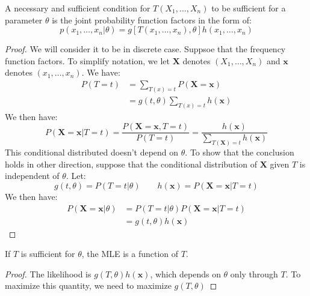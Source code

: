 \begin{theorem}
    A necessary and sufficient condition for $T(X_1,\dots,X_n)$ to be sufficient for a parameter $\theta$ is the joint probability function factors in the form of:
    \begin{equation*}
        p(x_1,\dots,x_n|\theta) = g[T(x_1,\dots,x_n), \theta]h(x_1,\dots,x_n)
    \end{equation*}
\end{theorem}
\begin{proof}
    We will consider it to be in discrete case. Suppsoe that the frequency function factors. To simplify notation, we let $\boldsymbol X$ denotes $(X_1,\dots,X_n)$ and $\boldsymbol x$ denotes $(x_1,\dots,x_n)$. We have:
    \begin{equation*}
    \begin{aligned}
        P(T = t) &= \sum_{T(x) = t}P(\boldsymbol X=\boldsymbol x) \\
        &= g(t, \theta) \sum_{T(x) = t} h(\boldsymbol x)
    \end{aligned}
    \end{equation*}
    We then have:
    \begin{equation*}
        P(\boldsymbol X=\boldsymbol x | T = t) = \frac{P(\boldsymbol X = \boldsymbol x, T = t)}{P(T = t)} = \frac{h(\boldsymbol x)}{\sum_{T(\boldsymbol X) = t}h(\boldsymbol x)}
    \end{equation*}
    This conditional distributed doesn't depend on $\theta$. To show that the conclusion holds in other direction, suppose that the conditional distribution of $\boldsymbol X$ given $T$ is independent of $\theta$. Let:
    \begin{equation*}
        g(t, \theta) = P(T=t|\theta) \qquad h(\boldsymbol x) = P(\boldsymbol X=\boldsymbol x | T = t)
    \end{equation*}
    We then have:
    \begin{equation*}
    \begin{aligned}
        P(\boldsymbol X = \boldsymbol x | \theta) &= P(T = t | \theta)P(\boldsymbol X=\boldsymbol x |T=t) \\
        &= g(t, \theta)h(\boldsymbol x)
    \end{aligned}
    \end{equation*}
\end{proof}

\begin{corollary}
    If $T$ is sufficient for $\theta$, the MLE is a function of $T$.
\end{corollary}
\begin{proof}
    The likelihood is $g(T, \theta)h(\boldsymbol x)$, which depends on $\theta$ only through $T$. To maximize this quantity, we need to maximize $g(T,\theta)$
\end{proof}

